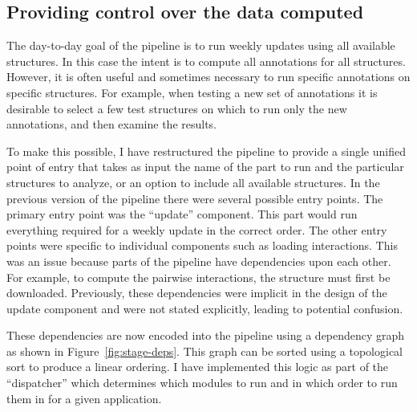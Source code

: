 \subsection{Providing control over the data computed}

The day-to-day goal of the pipeline is to run weekly updates using all available
structures. In this case the intent is to compute all annotations for all
structures. However, it is often useful and sometimes necessary to run specific
annotations on specific structures. For example, when testing a new set of
annotations it is desirable to select a few test structures on which to run only
the new annotations, and then examine the results.

To make this possible, I have restructured the pipeline to provide a single
unified point of entry that takes as input the name of the part to run and the
particular structures to analyze, or an option to include all available
structures. In the previous version of the pipeline there were several possible
entry points. The primary entry point was the ``update'' component. This part
would run everything required for a weekly update in the correct order. The
other entry points were specific to individual components such as loading
interactions. This was an issue because parts of the pipeline have dependencies
upon each other. For example, to compute the pairwise interactions, the
structure must first be downloaded. Previously, these dependencies were implicit
in the design of the update component and were not stated explicitly, leading to
potential confusion.

These dependencies are now encoded into the pipeline using a dependency graph as
shown in Figure~\ref{fig:stage-deps}. This graph can be sorted using a topological
sort to produce a linear ordering. I have implemented this logic as part of the
``dispatcher'' which determines which modules to run and in which order to run
them in for a given application.


